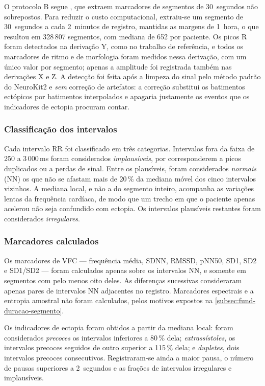 O protocolo B segue , que extraem marcadores de
segmentos de 30~segundos não sobrepostos. Para reduzir o custo
computacional, extraiu-se um segmento de 30~segundos a cada 2~minutos de
registro, mantidas as margens de 1~hora, o que resultou em 328\,807
segmentos, com mediana de 652 por paciente. Os picos R foram detectados na
derivação Y, como no trabalho de referência, e todos os marcadores de ritmo
e de morfologia foram medidos nessa derivação, com um único valor por
segmento; apenas a amplitude foi registrada também nas derivações X e Z. A
detecção foi feita após a limpeza do sinal pelo
método padrão do NeuroKit2 e \textit{sem} correção de artefatos: a correção
substitui os batimentos ectópicos por batimentos interpolados e apagaria
justamente os eventos que os indicadores de ectopia procuram contar.

\subsubsection{Classificação dos intervalos}

Cada intervalo RR foi classificado em três categorias. Intervalos fora da
faixa de 250 a 3\,000\,ms foram considerados \textit{implausíveis}, por
corresponderem a picos duplicados ou a perdas de sinal. Entre os plausíveis,
foram considerados \textit{normais} (NN) os que não se afastam mais de
20\,\% da mediana móvel dos cinco intervalos vizinhos. A mediana local, e
não a do segmento inteiro, acompanha as variações lentas da frequência
cardíaca, de modo que um trecho em que o paciente apenas acelerou não seja
confundido com ectopia. Os intervalos plausíveis restantes foram
considerados \textit{irregulares}.

\subsubsection{Marcadores calculados}

Os marcadores de \gls{VFC} --- frequência média, SDNN, RMSSD, pNN50, SD1,
SD2 e SD1/SD2 --- foram calculados apenas sobre os intervalos NN, e somente
em segmentos com pelo menos oito deles. As diferenças sucessivas
consideraram apenas pares de intervalos NN adjacentes no registro.
Marcadores espectrais e a entropia amostral não foram calculados, pelos
motivos expostos na \autoref{subsec:fund-duracao-segmento}.

Os indicadores de ectopia foram obtidos a partir da mediana local: foram
considerados \textit{precoces} os intervalos inferiores a 80\,\% dela;
\textit{extrassístoles}, os intervalos precoces seguidos de outro superior a
115\,\% dela; e \textit{dupletes}, dois intervalos precoces consecutivos.
Registraram-se ainda a maior pausa, o número de pausas superiores a
2~segundos e as frações de intervalos irregulares e implausíveis.

